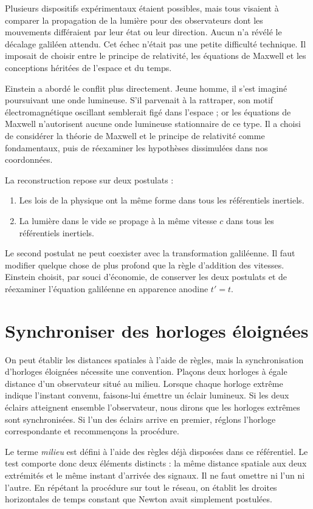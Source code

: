 Plusieurs dispositifs expérimentaux étaient possibles, mais tous visaient à comparer la propagation de la lumière pour des observateurs dont les mouvements différaient par leur état ou leur direction. Aucun n’a révélé le décalage galiléen attendu. Cet échec n’était pas une petite difficulté technique. Il imposait de choisir entre le principe de relativité, les équations de Maxwell et les conceptions héritées de l’espace et du temps.

Einstein a abordé le conflit plus directement. Jeune homme, il s’est imaginé poursuivant une onde lumineuse. S’il parvenait à la rattraper, son motif électromagnétique oscillant semblerait figé dans l’espace ; or les équations de Maxwell n’autorisent aucune onde lumineuse stationnaire de ce type. Il a choisi de considérer la théorie de Maxwell et le principe de relativité comme fondamentaux, puis de réexaminer les hypothèses dissimulées dans nos coordonnées.

La reconstruction repose sur deux postulats :
\begin{enumerate}\item Les lois de la physique ont la même forme dans tous les référentiels inertiels.
\item La lumière dans le vide se propage à la même vitesse \(c\) dans tous les référentiels inertiels.
\end{enumerate}

Le second postulat ne peut coexister avec la transformation galiléenne. Il faut modifier quelque chose de plus profond que la règle d’addition des vitesses. Einstein choisit, par souci d’économie, de conserver les deux postulats et de réexaminer l’équation galiléenne en apparence anodine \(t'=t\).

\section{Synchroniser des horloges éloignées}

On peut établir les distances spatiales à l’aide de règles, mais la synchronisation d’horloges éloignées nécessite une convention. Plaçons deux horloges à égale distance d’un observateur situé au milieu. Lorsque chaque horloge extrême indique l’instant convenu, faisons-lui émettre un éclair lumineux. Si les deux éclairs atteignent ensemble l’observateur, nous dirons que les horloges extrêmes sont synchronisées. Si l’un des éclairs arrive en premier, réglons l’horloge correspondante et recommençons la procédure.

Le terme \emph{milieu} est défini à l’aide des règles déjà disposées dans ce référentiel. Le test comporte donc deux éléments distincts : la même distance spatiale aux deux extrémités et le même instant d’arrivée des signaux. Il ne faut omettre ni l’un ni l’autre. En répétant la procédure sur tout le réseau, on établit les droites horizontales de temps constant que Newton avait simplement postulées.

